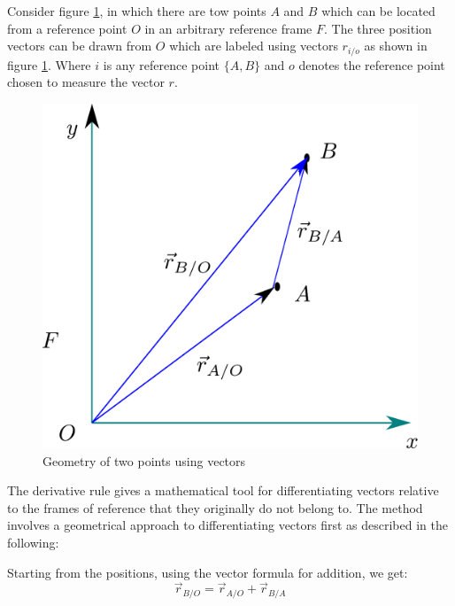 Consider figure \ref{Fig_ch_0_01_DerivateRule}, in which there are tow points $A$ and $B$ which can be located from a reference point $O$ in an arbitrary reference frame $F$. The three position vectors can be drawn from $O$ which are labeled using vectors $r_{i/o}$ as shown in figure \ref{Fig_ch_0_01_DerivateRule}. Where $i$ is any reference point $\{A,B\}$ and $o$ denotes the reference point chosen to measure the vector $r$.
\begin{figure}[h!]
	\centering
	\includegraphics[width=0.6\linewidth]{Bilder/01_DervativeRule.pdf}
	\caption{Geometry of two points using vectors}
	\label{Fig_ch_0_01_DerivateRule}
\end{figure}
The derivative rule gives a mathematical tool for differentiating vectors relative to the frames of reference that they originally do not belong to. The method involves a geometrical approach to differentiating vectors first as described in the following:

Starting from the positions, using the vector formula for addition, we get:
\begin{equation}
	\vec{r}_{B/O} = \vec{r}_{A/O} + \vec{r}_{B/A}
\end{equation}

